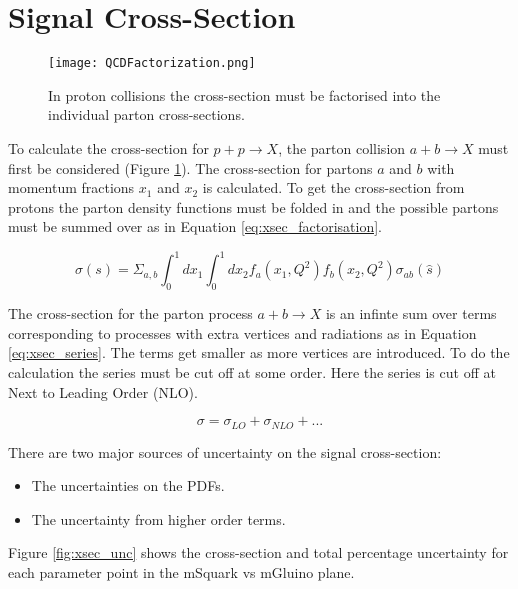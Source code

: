 \section{Signal Cross-Section}

\begin{figure}
\begin{center}
\texttt{[image: QCDFactorization.png]}
\end{center}
\caption{In proton collisions the cross-section must be factorised into the 
individual parton cross-sections.}
\label{fig:QCDFactorization}
\end{figure}

To calculate the cross-section for $p + p \rightarrow X$, the parton collision 
$a + b \rightarrow X$ must first be considered (Figure 
\ref{fig:QCDFactorization}). The cross-section for partons $a$ and $b$ with 
momentum fractions $x_{1}$ and $x_{2}$ is calculated. To get the cross-section 
from protons the parton density functions must be folded in and the possible 
partons must be summed over as in Equation \ref{eq:xsec_factorisation}.

\begin{equation}
\sigma(s) =
\Sigma_{a,b}\int_{0}^{1}dx_{1}\int_{0}^{1}dx_{2}f_{a}(x_{1},Q^{2})f_{b}(x_{2},Q^{2})\sigma_{ab}(\hat{s})
\label{eq:xsec_factorisation}
\end{equation}

The cross-section for the parton process $a + b \rightarrow X$ is an infinte sum
over terms corresponding to processes with extra vertices and radiations as in
Equation \ref{eq:xsec_series}. The terms get smaller as more vertices are 
introduced. To do the calculation the series must be cut off at some order. Here
the series is cut off at Next to Leading Order (NLO).

\begin{equation}
\sigma = \sigma_{LO} + \sigma_{NLO} + ...
\label{eq:xsec_series}
\end{equation}

There are two major sources of uncertainty on the signal cross-section:

\begin{itemize} 
\item The uncertainties on the PDFs.
\item The uncertainty from higher order terms.
\end{itemize}

Figure \ref{fig:xsec_unc} shows the cross-section and total percentage 
uncertainty for each parameter point in the mSquark vs mGluino plane.

